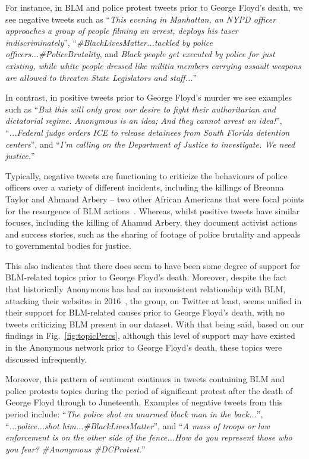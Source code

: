 \documentclass[letterpaper]{article}
\begin{document}
For instance, in BLM and police protest tweets prior to George Floyd's death, we see negative tweets such as ``\textit{This evening in Manhattan, an NYPD officer approaches a group of people filming an arrest, deploys his taser indiscriminately}'', ``\textit{\#BlackLivesMatter...tackled by police officers...\#PoliceBrutality}, and \textit{Black people get executed by police for just existing, while white people dressed like militia members carrying assault weapons are allowed to threaten State Legislators and staff...}''

In contrast, in positive tweets prior to George Floyd's murder we see examples such as ``\textit{But this will only grow our desire to fight their authoritarian and dictatorial regime. Anonymous is an idea; And they cannot arrest an idea!}'', ``\textit{...Federal judge orders ICE to release detainees from South Florida detention centers}'', and ``\textit{I'm calling on the Department of Justice to investigate. We need justice.}''

Typically, negative tweets are functioning to criticize the behaviours of police officers over a variety of different incidents, including the killings of Breonna Taylor and Ahmaud Arbery -- two other African Americans that were focal points for the resurgence of BLM actions~\cite{AlJazeera2020}. Whereas, whilst positive tweets have similar focuses, including the killing of Ahamud Arbery, they document activist actions and success stories, such as the sharing of footage of police brutality and appeals to governmental bodies for justice.

This also indicates that there does seem to have been some degree of support for BLM-related topics prior to George Floyd's death. Moreover, despite the fact that historically Anonymous has had an inconsistent relationship with BLM, attacking their websites in 2016~\cite{Verge2016}, the group, on Twitter at least, seems unified in their support for BLM-related causes prior to George Floyd's death, with no tweets criticizing BLM present in our dataset. With that being said, based on our findings in Fig.~\ref{fig:topicPercs}, although this level of support may have existed in the Anonymous network prior to George Floyd's death, these topics were discussed infrequently.

Moreover, this pattern of sentiment continues in tweets containing BLM and police protests topics during the period of significant protest after the death of George Floyd through to Juneteenth. Examples of negative tweets from this period include: ``\textit{The police shot an unarmed black man in the back...}'', ``\textit{...police...shot him...\#BlackLivesMatter}'', and ``\textit{A mass of troops or law enforcement is on the other side of the fence...How do you represent those who you fear? \#Anonymous \#DCProtest.}''
\end{document}
